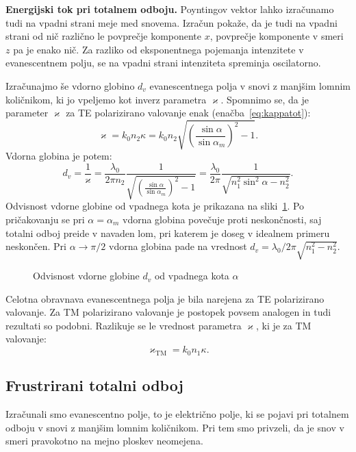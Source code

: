 \begin{example}{\bf Energijski tok pri totalnem odboju.}
Poyntingov vektor lahko izračunamo tudi na vpadni strani meje med snovema. Izračun pokaže, da
je tudi na vpadni strani od nič različno le povprečje komponente $x$, povprečje komponente v smeri $z$ 
pa je enako nič. Za razliko od eksponentnega pojemanja intenzitete v evanescentnem polju, se na
vpadni strani intenziteta spreminja oscilatorno.
\end{example}

Izračunajmo še vdorno globino $d_v$ evanescentnega polja
v snovi z manjšim lomnim količnikom, ki 
jo vpeljemo kot inverz parametra $\varkappa$. Spomnimo se, da je parameter $\varkappa$ za TE polarizirano
valovanje enak (enačba~\ref{eq:kappatot}):
\begin{equation}
\varkappa = k_0 n_2 \kappa = k_0 n_2 \sqrt{\left(\frac{\sin \alpha}{\sin \alpha_m}\right)^2-1}.
\label{eq:04_81}
\end{equation}
Vdorna globina je potem:
\begin{equation}
d_v = \frac{1}{\varkappa} = \frac{\lambda_0}{2 \pi n_2 }\frac{1}{\sqrt{\left(\frac{\sin \alpha}{\sin \alpha_m}\right)^2-1}}=
\frac{\lambda_0}{2\pi}\frac{1}{\sqrt{n_1^2\sin ^2\alpha - n_2^2}}.
\label{eq:04_82}
\end{equation}
Odvisnost vdorne globine od vpadnega kota je prikazana na sliki~\ref{fig:04_vdorna}. Po pričakovanju
se pri $\alpha = \alpha_m$ vdorna globina povečuje proti neskončnosti, saj totalni odboj 
preide v navaden lom, pri katerem je doseg v idealnem primeru neskončen. Pri $\alpha \to \pi/2$ vdorna
globina pade na vrednost $d_v = \lambda_0/2\pi \sqrt{n_1^2-n_2^2}$.
\begin{figure}[ht]
\centering
\def\svgwidth{80truemm} 

\caption{Odvisnost vdorne globine $d_v$ od vpadnega kota $\alpha$}
\label{fig:04_vdorna}
\end{figure}

\begin{remark}
Celotna obravnava evanescentnega polja je bila narejena za TE polarizirano valovanje. Za TM polarizirano
valovanje je postopek povsem analogen in tudi rezultati so podobni. Razlikuje se le vrednost
parametra $\varkappa$, ki je za TM valovanje:
\begin{equation}
\varkappa_\mathrm{TM} = k_0 n_1 \kappa.
\label{eq:kappatottm}
\end{equation}
\end{remark}

\subsection*{Frustrirani totalni odboj}
Izračunali smo evanescentno polje, to je električno polje, ki se pojavi pri totalnem odboju
v snovi z manjšim lomnim količnikom. Pri tem smo privzeli, da je snov v smeri pravokotno
na mejno ploskev neomejena. 

